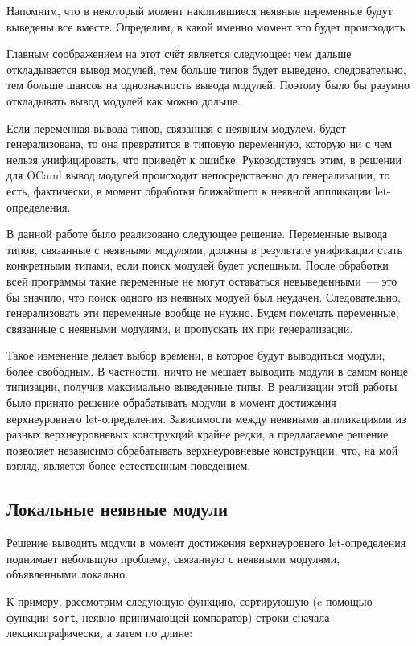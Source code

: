 \documentclass[../diploma.tex]{subfiles}
\begin{document}
Напомним, что в некоторый момент накопившиеся неявные переменные будут выведены все вместе. Определим, в какой именно момент это будет происходить.

Главным соображением на этот счёт является следующее: чем дальше откладывается вывод модулей, тем больше типов будет выведено, следовательно, тем больше шансов на однозначность вывода модулей. Поэтому было бы разумно откладывать вывод модулей как можно дольше.

Если переменная вывода типов, связанная с неявным модулем, будет генерализована, то она превратится в типовую переменную, которую ни с чем нельзя унифицировать, что приведёт к ошибке. Руководствуясь этим, в решении для OCaml вывод модулей происходит непосредственно до генерализации, то есть, фактически, в момент обработки ближайшего к неявной аппликации let-определения.

В данной работе было реализовано следующее решение. Переменные вывода типов, связанные с неявными модулями, должны в результате унификации стать конкретными типами, если поиск модулей будет успешным. После обработки всей программы такие переменные не могут оставаться невыведенными~--- это бы значило, что поиск одного из неявных модуей был неудачен. Следовательно, генерализовать эти переменные вообще не нужно. Будем помечать переменные, связанные с неявными модулями, и пропускать их при генерализации. 

Такое изменение делает выбор времени, в которое будут выводиться модули, более свободным. В частности, ничто не мешает выводить модули в самом конце типизации, получив максимально выведенные типы. В реализации этой работы было принято решение обрабатывать модули в момент достижения верхнеуровнего let-определения. Зависимости между неявными аппликациями из разных верхнеуровневых конструкций крайне редки, а предлагаемое решение позволяет независимо обрабатывать верхнеуровневые конструкции, что, на мой взгляд, является более естественным поведением.

\subsection{Локальные неявные модули}

Решение выводить модули в момент достижения верхнеуровнего let-определения поднимает небольшую проблему, связанную с неявными модулями, объявленными локально.

К примеру, рассмотрим следующую функцию, сортирующую (c помощью функции \texttt{sort}, неявно принимающей компаратор) строки сначала лексикографически, а затем по длине:
\end{document}
